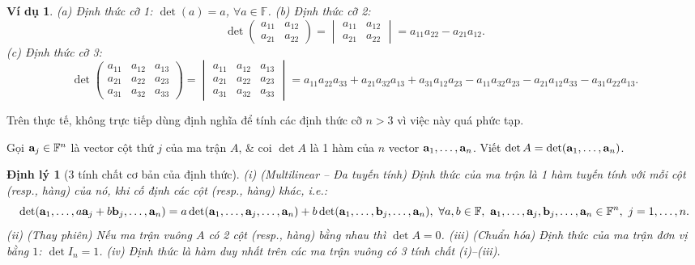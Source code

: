 \documentclass{article}
\newtheorem{dinhly}{Định lý}
\newtheorem{vidu}{Ví dụ}
\begin{document}
\begin{vidu}
	(a) Định thức cỡ 1: $\det(a) = a$, $\forall a\in\mathbb{F}$. (b) Định thức cỡ 2:
	\begin{equation*}
		\det\begin{pmatrix}
			a_{11} & a_{12}\\a_{21} & a_{22}
		\end{pmatrix} = \begin{vmatrix}
			a_{11} & a_{12}\\a_{21} & a_{22}
		\end{vmatrix} = a_{11}a_{22} - a_{21}a_{12}.
	\end{equation*}
	(c) Định thức cỡ 3:
	\begin{equation*}
		\det\begin{pmatrix}
			a_{11} & a_{12} & a_{13}\\a_{21} & a_{22} & a_{23}\\a_{31} & a_{32} & a_{33}
		\end{pmatrix} = \begin{vmatrix}
			a_{11} & a_{12} & a_{13}\\a_{21} & a_{22} & a_{23}\\a_{31} & a_{32} & a_{33}
		\end{vmatrix} = a_{11}a_{22}a_{33} + a_{21}a_{32}a_{13} + a_{31}a_{12}a_{23} - a_{11}a_{32}a_{23} - a_{21}a_{12}a_{33} - a_{31}a_{22}a_{13}.
	\end{equation*}
\end{vidu}
Trên thực tế, không trực tiếp dùng định nghĩa để tính các định thức cỡ $n > 3$ vì việc này quá phức tạp.

Gọi ${\bf a}_j\in\mathbb{F}^n$ là vector cột thứ $j$ của ma trận $A$, \& coi $\det A$ là 1 hàm của $n$ vector ${\bf a}_1,\ldots,{\bf a}_n$. Viết $\det A = \det({\bf a}_1,\ldots,{\bf a}_n)$.

\begin{dinhly}[3 tính chất cơ bản của định thức]
	(i) {\rm(Multilinear -- Đa tuyến tính)} Định thức của ma trận là 1 hàm tuyến tính với mỗi cột (resp., hàng) của nó, khi cố định các cột (resp., hàng) khác, i.e.:
	\begin{equation*}
		\det({\bf a}_1,\ldots,a{\bf a}_j + b{\bf b}_j,\ldots,{\bf a}_n) = a\det({\bf a}_1,\ldots,{\bf a}_j,\ldots,{\bf a}_n) + b\det({\bf a}_1,\ldots,{\bf b}_j,\ldots,{\bf a}_n),\ \forall a,b\in\mathbb{F},\ {\bf a}_1,\ldots,{\bf a}_j,{\bf b}_j,\ldots,{\bf a}_n\in\mathbb{F}^n,\ j = 1,\ldots,n.
	\end{equation*}
	(ii) {\rm(Thay phiên)} Nếu ma trận vuông $A$ có 2 cột (resp., hàng) bằng nhau thì $\det A = 0$. (iii) {\rm(Chuẩn hóa)} Định thức của ma trận đơn vị bằng $1$: $\det I_n = 1$. (iv) Định thức là hàm duy nhất trên các ma trận vuông có 3 tính chất (i)--(iii).
\end{dinhly}
\end{document}
